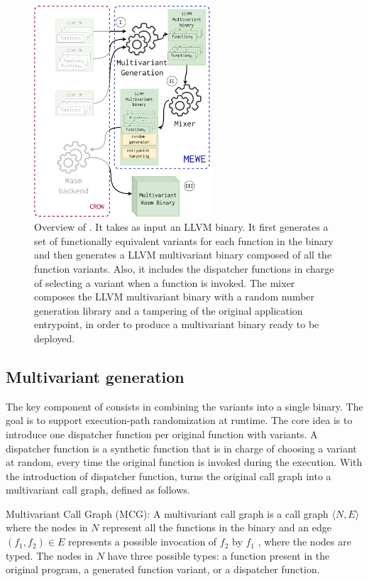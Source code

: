 \begin{figure}
  \centering
  \includegraphics[height=3.1in]{diagrams/MEWE.pdf}
  \caption{Overview of \tool. It takes as input an LLVM binary. It first generates a set of functionally equivalent variants for each function in the binary and then generates a LLVM multivariant binary composed of all the function variants. Also, it includes the dispatcher functions in charge of selecting a variant when a function is invoked. The \tool mixer composes the LLVM multivariant binary with a random number generation library and a tampering of the original application entrypoint, in order to produce a \wasm multivariant binary ready to be deployed. }
  \label{workflow}
\end{figure}


\subsection*{Multivariant generation}

The key component of \tool consists in combining the variants into a single binary.
The goal is to support execution-path randomization at runtime.
The core idea is to introduce one dispatcher function per original function with variants.
A dispatcher function is a synthetic function that is in charge of choosing a variant at random, every time the original function is invoked during the execution.
With the introduction of dispatcher function,  \tool turns the original call graph into a multivariant call graph, defined as follows. 

\begin{definition}{Multivariant Call Graph (MCG):}\label{def:EP}
    A multivariant call graph is a call graph $\langle N, E \rangle$ where the nodes in $N$ represent all the functions in the binary and an edge $(f_1,f_2) \in E$ represents a possible invocation of $f_2$ by $f_1$  \cite{ryder1979}, where the nodes are typed. The nodes in $N$ have three possible types: a function present in the original program,  a generated function variant, or a dispatcher function.
\end{definition}


